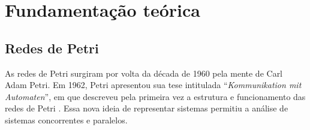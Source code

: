 \documentclass[
	12pt,				%
	openright,			%
	oneside,			%
	a4paper,			%
	english,			%
	brazil				%
	]{abntex2}
\begin{document}

\chapter{Fundamentação teórica} \label{cap:revisao-de-literatura}







\section{Redes de Petri}

As redes de Petri surgiram por volta da década de 1960 pela mente de Carl Adam Petri. Em 1962, Petri apresentou sua tese intitulada ``\textit{Kommunikation mit Automaten}'', em que descreveu pela primeira vez a estrutura e funcionamento das redes de Petri \cite{petri1962kommunikation}. Essa nova ideia de representar sistemas permitiu a análise de sistemas concorrentes e paralelos.
\end{document}
